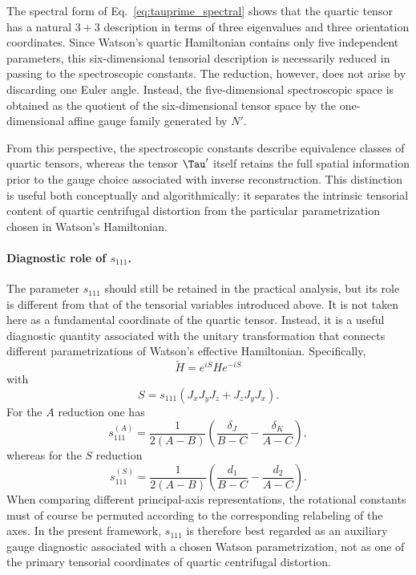 The spectral form of Eq.~\eqref{eq:tauprime_spectral} shows that the quartic
tensor has a natural $3+3$ description in terms of three eigenvalues and three
orientation coordinates.  Since Watson's quartic Hamiltonian contains only five
independent parameters, this six-dimensional tensorial description is necessarily
reduced in passing to the spectroscopic constants.  The reduction, however, does
not arise by discarding one Euler angle.  Instead, the five-dimensional
spectroscopic space is obtained as the quotient of the six-dimensional tensor
space by the one-dimensional affine gauge family generated by $N'$.

From this perspective, the spectroscopic constants describe equivalence classes
of quartic tensors, whereas the tensor $\Tau'$ itself retains the full spatial
information prior to the gauge choice associated with inverse reconstruction.
This distinction is useful both conceptually and algorithmically: it separates
the intrinsic tensorial content of quartic centrifugal distortion from the
particular parametrization chosen in Watson's Hamiltonian.

\paragraph{Diagnostic role of $s_{111}$.}

The parameter $s_{111}$ should still be retained in the practical analysis, but
its role is different from that of the tensorial variables introduced above.  It
is not taken here as a fundamental coordinate of the quartic tensor.  Instead,
it is a useful diagnostic quantity associated with the unitary transformation
that connects different parametrizations of Watson's effective Hamiltonian.
\cite{Watson1968JCP}
Specifically,
\[
\tilde H=e^{iS}He^{-iS}
\]
with
\[
S=s_{111}(J_xJ_yJ_z+J_zJ_yJ_x).
\]
For the $A$ reduction one has
\begin{equation}
s_{111}^{(A)} =
\frac{1}{2(A-B)}
\left(
\frac{\delta_J}{B-C}
-\frac{\delta_K}{A-C}
\right),
\label{eq:s111_A}
\end{equation}
whereas for the $S$ reduction
\begin{equation}
s_{111}^{(S)} =
\frac{1}{2(A-B)}
\left(
\frac{d_1}{B-C}
-\frac{d_2}{A-C}
\right).
\label{eq:s111_S}
\end{equation}
When comparing different principal-axis representations, the rotational
constants must of course be permuted according to the corresponding relabeling
of the axes.  In the present framework, $s_{111}$ is therefore best regarded as
an auxiliary gauge diagnostic associated with a chosen Watson parametrization,
not as one of the primary tensorial coordinates of quartic centrifugal
distortion.


